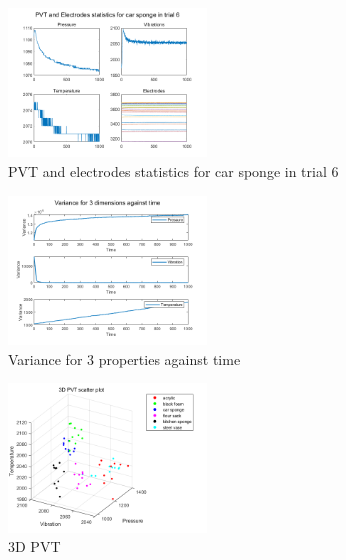 \documentclass[10pt,twocolumn,letterpaper]{article}
\begin{document}
\begin{figure}[h]
\begin{center}
   \includegraphics[width=0.47\textwidth]{part1_9}
\end{center}
   \caption{PVT and electrodes statistics for car sponge in trial 6}
\label{fig:9}
\end{figure}

\begin{figure}[h]
\begin{center}
   \includegraphics[width=0.47\textwidth]{part1_10}
\end{center}
   \caption{Variance for 3 properties against time}
\label{fig:10}
\end{figure}

\begin{figure}[h]
\begin{center}
   \includegraphics[width=0.47\textwidth]{part3_1}
\end{center}
   \caption{3D PVT}
\label{fig:11}
\end{figure}
\end{document}
